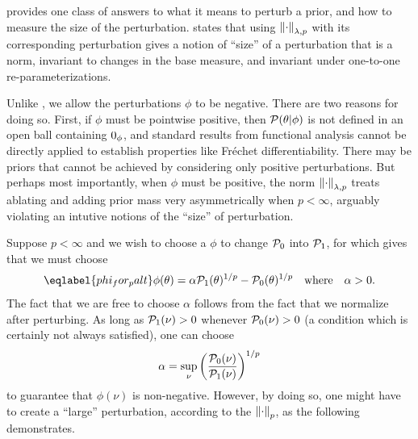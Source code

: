  provides one class of answers to what it means to perturb
a prior, and how to measure the size of the perturbation.  \citep[Result
2]{gustafson:1996:local} states that using $\left\Vert\cdot\right\Vert_{\lambda, p}$ with its
corresponding perturbation gives a notion of ``size'' of a perturbation that is
a norm, invariant to changes in the base measure, and invariant under one-to-one
re-parameterizations.

Unlike \citep{gustafson:1996:local}, we allow the perturbations $\phi$ to be
negative.  There are two reasons for doing so.  First, if $\phi$ must be
pointwise positive, then $\mathcal{P}(\theta \vert \phi)$ is not defined in an open ball
containing $0_\phi$, and standard results from functional analysis cannot be
directly applied to establish properties like Fr{\'e}chet differentiability.
There may be priors that cannot be achieved by considering only positive
perturbations.  But perhaps most importantly, when $\phi$ must be positive, the
norm $\left\Vert\cdot\right\Vert_{\lambda, p}$ treats ablating and adding prior mass very
asymmetrically when $p < \infty$, arguably violating an intutive notions of the
``size'' of perturbation.

Suppose $p < \infty$ and we wish to choose a $\phi$ to change $\mathcal{P}_{0}$ into
$\mathcal{P}_{1}$, for which  gives that we must choose
%
\begin{align}\eqlabel{phi_for_palt}
%
\phi(\theta) = \alpha \palt(\theta)^{1/p} - \pbase(\theta)^{1/p}
    \mathtxt{where}\alpha > 0.
%
\end{align}
%
The fact that we are free to choose $\alpha$ follows from the fact that we
normalize after perturbing.  As long as $\mathcal{P}_{1}(\nu) > 0$ whenever $\mathcal{P}_{0}(\nu) >
0$ (a condition which is certainly not always satisfied), one can choose
%
\begin{align*}
%
\alpha = \sup_{\nu} \left(\frac{\pbase(\nu)}{\palt(\nu)}\right)^{1/p}
%
\end{align*}
%
to guarantee that $\phi(\nu)$ is non-negative.  However, by doing so, one might
have to create a ``large'' perturbation, according to the $\left\Vert\cdot\right\Vert_p$,
as the following  demonstrates.



